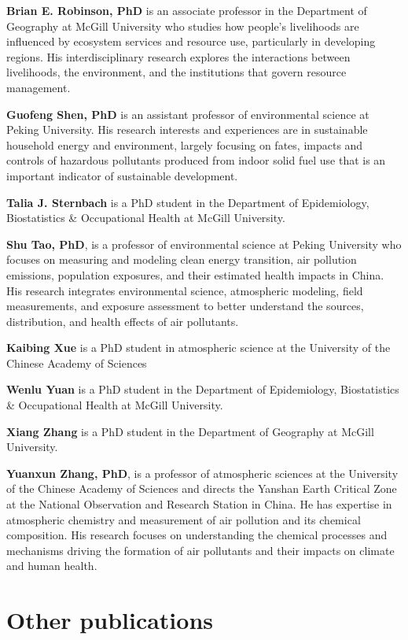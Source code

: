 \documentclass[
  letterpaper,
  DIV=11,
  numbers=noendperiod]{scrartcl}
\begin{document}
\textbf{Brian E. Robinson, PhD} is an associate professor in the
Department of Geography at McGill University who studies how people's
livelihoods are influenced by ecosystem services and resource use,
particularly in developing regions. His interdisciplinary research
explores the interactions between livelihoods, the environment, and the
institutions that govern resource management.

\textbf{Guofeng Shen, PhD} is an assistant professor of environmental
science at Peking University. His research interests and experiences are
in sustainable household energy and environment, largely focusing on
fates, impacts and controls of hazardous pollutants produced from indoor
solid fuel use that is an important indicator of sustainable
development.

\textbf{Talia J. Sternbach} is a PhD student in the Department of
Epidemiology, Biostatistics \& Occupational Health at McGill University.

\textbf{Shu Tao, PhD}, is a professor of environmental science at Peking
University who focuses on measuring and modeling clean energy
transition, air pollution emissions, population exposures, and their
estimated health impacts in China. His research integrates environmental
science, atmospheric modeling, field measurements, and exposure
assessment to better understand the sources, distribution, and health
effects of air pollutants.

\textbf{Kaibing Xue} is a PhD student in atmospheric science at the
University of the Chinese Academy of Sciences

\textbf{Wenlu Yuan} is a PhD student in the Department of Epidemiology,
Biostatistics \& Occupational Health at McGill University.

\textbf{Xiang Zhang} is a PhD student in the Department of Geography at
McGill University.

\textbf{Yuanxun Zhang, PhD}, is a professor of atmospheric sciences at
the University of the Chinese Academy of Sciences and directs the
Yanshan Earth Critical Zone at the National Observation and Research
Station in China. He has expertise in atmospheric chemistry and
measurement of air pollution and its chemical composition. His research
focuses on understanding the chemical processes and mechanisms driving
the formation of air pollutants and their impacts on climate and human
health.

\section*{Other publications}\label{other-publications}
\end{document}
